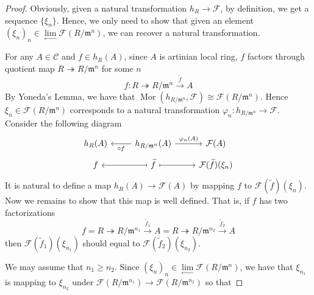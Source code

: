 \documentclass{ctexart}
\newcommand{\mor}{\operatorname{Mor}}
\newcommand{\inverselimit}{\underset{\longleftarrow}{\lim}}
\begin{document}
\begin{proof}
    Obviously, given a natural transformation $h_{R} \rightarrow \mathcal{F}$, by definition, we get a sequence $\{\xi_{n}\}$.
    Hence, we only need to show that given an element $(\xi_{n})_{n}\in \inverselimit \mathcal{F}(R/\mathfrak{m}^{n})$,
    we can recover a natural transformation.
    \par
    For any $A\in \mathcal{C}$ and $f\in h_{R}(A)$, since $A$ is artinian local ring, $f$ factors through quotient map $R \twoheadrightarrow R/\mathfrak{m}^{n}$ for some $n$
    \begin{equation}
        f: R \twoheadrightarrow R/\mathfrak{m}^{n} \overset{\widetilde{f}}{\longrightarrow} A
    \end{equation}
    By Yoneda's Lemma, we have that $\mor(h_{R/\mathfrak{m}^{n}}, \mathcal{F}) \cong \mathcal{F}(R/\mathfrak{m}^{n})$.
    Hence $\xi_{n}\in \mathcal{F}(R/\mathfrak{m}^{n})$ corresponds to a natural transformation $\varphi_{n}: h_{R/\mathfrak{m}^{n}} \rightarrow \mathcal{F}$.
    Consider the following diagram
    \begin{equation}
        \begin{tikzcd}[row sep = tiny]
            h_{R}(A) & 
            h_{R/\mathfrak{m}^{n}}(A) \arrow[r, "\varphi_{n}(A)"] \arrow[l, "\circ f"] &
            \mathcal{F}(A) \\
            f &
            \widetilde{f} \arrow[r, mapsto] \arrow[l, mapsto] &
            \mathcal{F}(\widetilde{f})(\xi_{n})
        \end{tikzcd}
    \end{equation}
    It is natural to define a map $h_{R}(A) \rightarrow \mathcal{F}(A)$ by mapping $f$ to $\mathcal{F}(\widetilde{f})(\xi_{n})$.
    Now we remains to show that this map is well defined.
    That is, if $f$ has two factorizations 
    \begin{equation}
        f = R \twoheadrightarrow R/\mathfrak{m}^{n_{1}} \overset{\widetilde{f}_{1}}{\longrightarrow} A = R \twoheadrightarrow R/\mathfrak{m}^{n_{2}} \overset{\widetilde{f}_{2}}{\longrightarrow} A
    \end{equation}
    then $\mathcal{F}(\widetilde{f}_{1})(\xi_{n_{1}})$ should equal to $\mathcal{F}(\widetilde{f}_{2})(\xi_{n_{2}})$.
    \par
    We may assume that $n_{1} \ge n_{2}$.
    Since $(\xi_{n})_{n}\in \inverselimit \mathcal{F}(R/\mathfrak{m}^{n})$, we have that $\xi_{n_{1}}$ is mapping to $\xi_{n_{2}}$ under $\mathcal{F}(R/\mathfrak{m}^{n_{1}}) \rightarrow \mathcal{F}(R/\mathfrak{m}^{n_{2}})$ so that

\end{proof}
\end{document}
